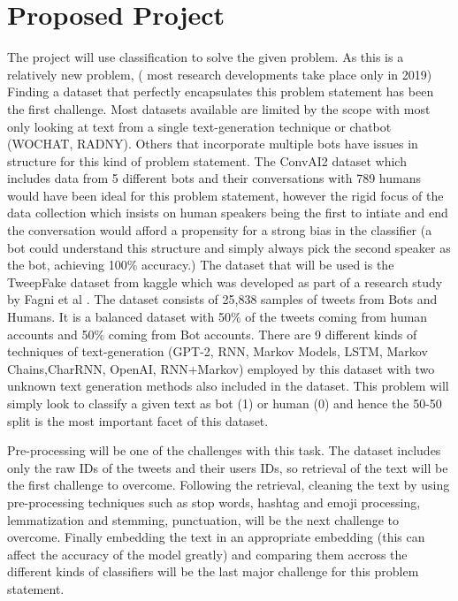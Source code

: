 \documentclass[12pt]{article}
\begin{document}
\section{Proposed Project}
The project will use classification to solve the given problem. As this is a relatively new problem, ( most research developments take place only in 2019) Finding a dataset that perfectly encapsulates this problem statement has been the first challenge. Most datasets available are limited by the scope with most only looking at text from a single text-generation technique or chatbot (WOCHAT, RADNY). Others that incorporate multiple bots have issues in structure for this kind of problem statement. The ConvAI2 dataset which includes data from 5 different bots and their conversations with 789 humans would have been ideal for this problem statement, however the rigid focus of the data collection which insists on human speakers being the first to intiate and end the conversation would afford a propensity for a strong bias in the classifier (a bot could understand this structure and simply always pick the second speaker as the bot, achieving 100\% accuracy.) 
The dataset that will be used is the TweepFake dataset from kaggle \cite{noauthor_tweepfake_nodate} which was developed as part of a research study by Fagni et al \cite{fagni_tweepfake_2021}. The dataset consists of 25,838 samples of tweets from Bots and Humans. It is a balanced dataset with 50\% of the tweets coming from human accounts and 50\% coming from Bot accounts.  There are 9 different kinds of techniques of text-generation (GPT-2, RNN, Markov Models, LSTM, Markov Chains,CharRNN, OpenAI, RNN+Markov) employed by this dataset with two unknown text generation methods also included in the dataset. This problem will simply look to classify a given text as bot (1) or human (0) and hence the 50-50 split is the most important facet of this dataset. 

Pre-processing will be one of the challenges with this task. The dataset includes only the raw IDs of the tweets and their users IDs, so retrieval of the text will be the first challenge to overcome. Following the retrieval, cleaning the text by using pre-processing techniques such as stop words, hashtag and emoji processing, lemmatization and stemming, punctuation, will be the next challenge to overcome. Finally embedding the text in an appropriate embedding (this can affect the accuracy of the model greatly) and comparing them accross the different kinds of classifiers will be the last major challenge for this problem statement. 
\end{document}
